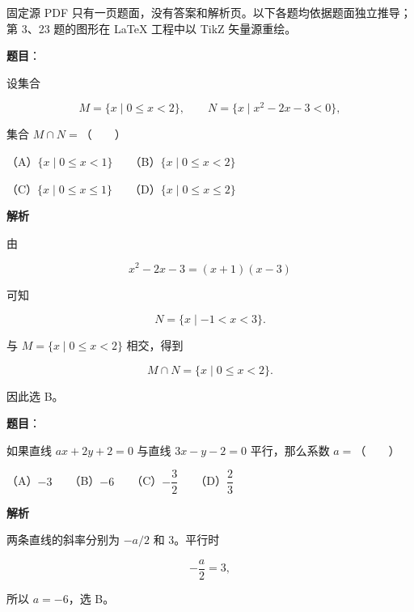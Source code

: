 

\begin{gktip}
固定源 PDF 只有一页题面，没有答案和解析页。以下各题均依据题面独立推导；第 3、23 题的图形在 LaTeX 工程中以 TikZ 矢量源重绘。
\end{gktip}

\begin{answer}

\textbf{题目}：

设集合

\nopagebreak[4]
\[
M=\{x\mid 0\leqslant x<2\},\qquad
N=\{x\mid x^2-2x-3<0\},
\]

集合 $M\cap N=$\mbox{（　　）}

（A）$\{x\mid 0\leqslant x<1\}$　　（B）$\{x\mid 0\leqslant x<2\}$

（C）$\{x\mid 0\leqslant x\leqslant 1\}$　　（D）$\{x\mid 0\leqslant x\leqslant 2\}$

\textbf{解析}

由

\nopagebreak[4]
\[
x^2-2x-3=(x+1)(x-3)
\]

可知

\nopagebreak[4]
\[
N=\{x\mid -1<x<3\}.
\]

与 $M=\{x\mid0\leqslant x<2\}$ 相交，得到

\nopagebreak[4]
\[
M\cap N=\{x\mid0\leqslant x<2\}.
\]

因此选 B。


\end{answer}
\begin{answer}

\textbf{题目}：

如果直线 $ax+2y+2=0$ 与直线 $3x-y-2=0$ 平行，那么系数 $a=$\mbox{（　　）}

（A）$-3$　　（B）$-6$　　（C）$-\dfrac32$　　（D）$\dfrac23$

\textbf{解析}

两条直线的斜率分别为 $-a/2$ 和 $3$。平行时

\nopagebreak[4]
\[
-\frac a2=3,
\]

所以 $a=-6$，选 B。


\end{answer}
